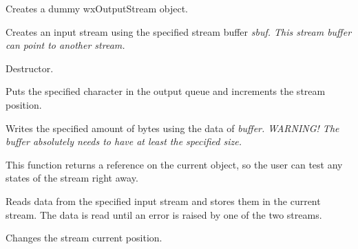 





Creates a dummy wxOutputStream object.


Creates an input stream using the specified stream buffer \it{sbuf}. This
stream buffer can point to another stream.



Destructor.



Puts the specified character in the output queue and increments the
stream position.



Writes the specified amount of bytes using the data of \it{buffer}.
\it{WARNING!} The buffer absolutely needs to have at least the specified size.

This function returns a reference on the current object, so the user can test
any states of the stream right away.


Reads data from the specified input stream and stores them 
in the current stream. The data is read until an error is raised
by one of the two streams.



Changes the stream current position.


